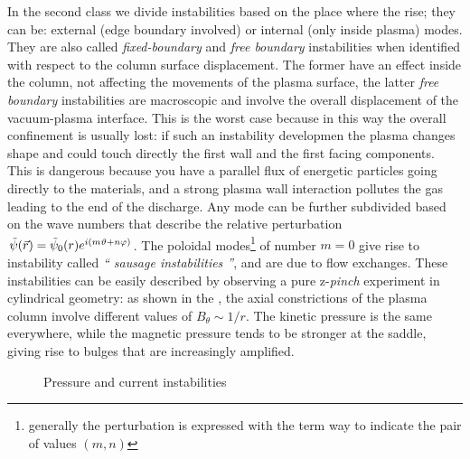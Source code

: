 In the second class we divide instabilities based on the place where the rise; they can be: external (edge boundary involved) or internal (only inside plasma) modes. 
They are also called \emph{fixed-boundary} and \emph{free boundary} instabilities when identified with respect to the column surface displacement. The former have an effect inside the column, not affecting the movements of the plasma surface, the latter \emph{free boundary} instabilities are macroscopic and involve the overall displacement of the vacuum-plasma interface.
This is the worst case because in this way the overall confinement is usually lost: if such an instability developmen the plasma changes shape and could touch directly the first wall and the first facing components. This is dangerous because you have a parallel flux of energetic particles going directly to the materials, and a strong plasma wall interaction pollutes the gas leading to the end of the discharge.
%
Any mode can be further subdivided based on the wave numbers that describe the relative perturbation $\tilde{\psi}(\Vec{r}) =
\Tilde{\psi}_0(r)e^{i(m\vartheta+n\varphi)}$.
%
The poloidal modes\footnote{generally the perturbation is expressed with the term way to indicate the pair of values $(m, n)$} of number $m = 0$ give rise to instability called \emph{`` sausage instabilities ''}, and are due to flow exchanges. These instabilities can be easily described by observing a pure z-\textit{pinch} experiment in cylindrical geometry: as shown in the \Figure{\ref{fig:press-curr1}}, the axial constrictions of the plasma column involve different values of $B_\theta \sim 1/r$. The kinetic pressure is the same everywhere, while the magnetic pressure tends to be stronger at the saddle, giving rise to bulges that are increasingly amplified.
%
\begin{figure}[ht]
 \centering
 \caption{Pressure and current instabilities}
\end{figure}

